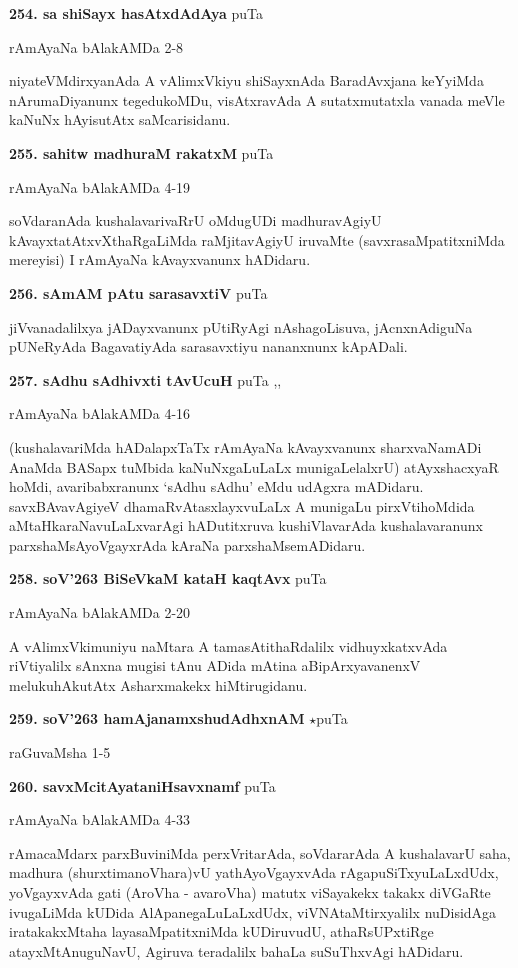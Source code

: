 \medskip
\noindent\textbf{254. sa shiSayx hasAtxdAdAya} \hfill puTa \pageref{198b}

\hfill rAmAyaNa bAlakAMDa 2-8

niyateVMdirxyanAda A vAlimxVkiyu shiSayxnAda BaradAvxjana keYyiMda nArumaDiyanunx tegedukoMDu, visAtxravAda A sutatxmutatxla vanada meVle kaNuNx hAyisutAtx saMcarisidanu.

\medskip
\noindent\textbf{255. sahitw madhuraM rakatxM} \hfill puTa \pageref{189b}

\hfill rAmAyaNa bAlakAMDa 4-19

soVdaranAda kushalavarivaRrU oMdugUDi madhuravAgiyU kAvayxtatAtxvXthaRgaLiMda raMjitavAgiyU iruvaMte (savxrasaMpatitxniMda mereyisi) I rAmAyaNa kAvayxvanunx hADidaru.

\medskip
\noindent\textbf{256. sAmAM pAtu sarasavxtiV} \hfill puTa \pageref{100a}

\hfill jiVvanadalilxya jADayxvanunx pUtiRyAgi nAshagoLisuva, jAcnxnAdiguNa pUNeRyAda BagavatiyAda sarasavxtiyu nananxnunx kApADali.

\medskip
\noindent\textbf{257. sAdhu sAdhivxti tAvUcuH} \hfill puTa \pageref{168f},\pageref{211g},\pageref{242a}

\hfill rAmAyaNa bAlakAMDa 4-16

(kushalavariMda hADalapxTaTx rAmAyaNa kAvayxvanunx sharxvaNamADi AnaMda BASapx tuMbida kaNuNxgaLuLaLx munigaLelalxrU) atAyxshacxyaR hoMdi, avaribabxranunx `sAdhu sAdhu' eMdu udAgxra mADidaru. savxBAvavAgiyeV dhamaRvAtasxlayxvuLaLx A munigaLu pirxVtihoMdida aMtaHkaraNavuLaLxvarAgi hADutitxruva kushiVlavarAda kushalavaranunx parxshaMsAyoVgayxrAda kAraNa parxshaMsemADidaru.

\medskip
\noindent\textbf{258. soV\char'263 BiSeVkaM kataH kaqtAvx} \hfill puTa \pageref{201c}

\hfill rAmAyaNa bAlakAMDa 2-20

A vAlimxVkimuniyu naMtara A tamasAtithaRdalilx vidhuyxkatxvAda riVtiyalilx sAnxna mugisi tAnu ADida mAtina aBipArxyavanenxV melukuhAkutAtx Asharxmakekx hiMtirugidanu.

\medskip
\noindent\textbf{259. soV\char'263 hamAjanamxshudAdhxnAM} $\star$\hfill puTa \pageref{148b}

\hfill raGuvaMsha 1-5

\medskip
\noindent\textbf{260. savxMcitAyataniHsavxnamf} \hfill puTa \pageref{250b}

\hfill rAmAyaNa bAlakAMDa 4-33

rAmacaMdarx parxBuviniMda perxVritarAda, soVdararAda A kushalavarU saha, madhura (shurxtimanoVhara)vU yathAyoVgayxvAda rAgapuSiTxyuLaLxdUdx, yoVgayxvAda gati (AroVha - avaroVha) matutx viSayakekx takakx diVGaRte ivugaLiMda kUDida AlApanegaLuLaLxdUdx, viVNAtaMtirxyalilx nuDisidAga iratakakxMtaha layasaMpatitxniMda kUDiruvudU, athaRsUPxtiRge atayxMtAnuguNavU, Agiruva teradalilx bahaLa suSuThxvAgi hADidaru.

